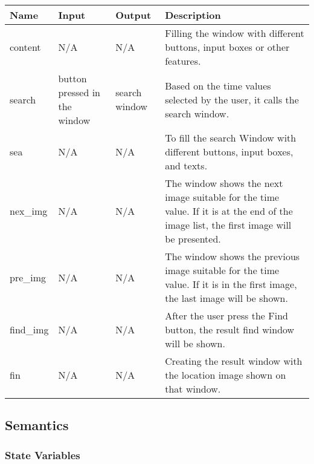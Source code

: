 \documentclass[12pt, titlepage]{article}
\begin{document}
\begin{center}
\begin{tabular}{|p{2cm}|p{2.5cm}|l|p{7.5cm}|}
\hline
\textbf{Name} & \textbf{Input} & \textbf{Output} & \textbf{Description}\\
\hline
content & N/A & N/A & Filling the window with different buttons, input boxes or other features.\\
\hline
search & button pressed in the window & search window & Based on the time values selected by the user, it calls the search window.\\
\hline
sea & N/A & N/A & To fill the search Window with different buttons, input boxes, and texts. \\
\hline
nex\_img & N/A & N/A & The window shows the next image suitable for the time value. If it is at the end of the image list, the first image will be presented.\\
\hline
pre\_img & N/A & N/A & The window shows the previous image suitable for the time value. If it is in the first image, the last image will be shown. \\
\hline
find\_img & N/A & N/A & After the user press the Find button, the result find window will be shown. \\
\hline
fin & N/A & N/A & Creating the result window with the location image shown on that window.\\
\hline

\end{tabular}
\end{center}

\subsection{Semantics}

\subsubsection{State Variables}
\end{document}

